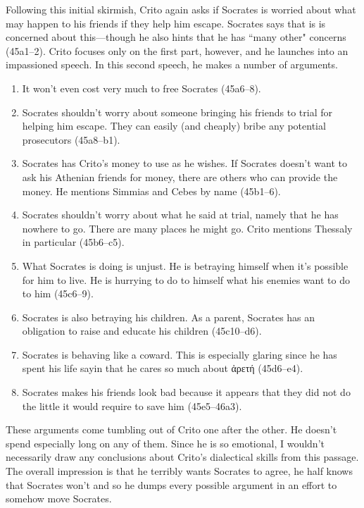 \documentclass[11pt]{article}
\begin{document}
Following this initial skirmish, Crito again asks if Socrates is worried about what may happen to his friends if they help him escape.  Socrates says that is is concerned about this---though he also hints that he has ``many other" concerns (45a1--2).  Crito focuses only on the first part, however, and he launches into an impassioned speech.  In this second speech, he makes a number of arguments.

\begin{enumerate}
    \item It won't even cost very much to free Socrates (45a6--8).
    \item Socrates shouldn't worry about someone bringing his friends to trial for helping him escape.  They can easily (and cheaply) bribe any potential prosecutors (45a8--b1).
    \item Socrates has Crito's money to use as he wishes.  If Socrates doesn't want to ask his Athenian friends for money, there are others who can provide the money.  He mentions Simmias and Cebes by name (45b1--6).
    \item Socrates shouldn't worry about what he said at trial, namely that he has nowhere to go.  There are many places he might go.  Crito mentions Thessaly in particular (45b6--c5).
    \item What Socrates is doing is unjust.  He is betraying himself when it's possible for him to live.  He is hurrying to do to himself what his enemies want to do to him (45c6--9).
    \item Socrates is also betraying his children.  As a parent, Socrates has an obligation to raise and educate his children (45c10--d6).
    \item Socrates is behaving like a coward.  This is especially glaring since he has spent his life sayin that he cares so much about ἀρετή (45d6--e4).
    \item Socrates makes his friends look bad because it appears that they did not do the little it would require to save him (45e5--46a3).
\end{enumerate}

These arguments come tumbling out of Crito one after the other.  He doesn't spend especially long on any of them.  Since he is so emotional, I wouldn't necessarily draw any conclusions about Crito's dialectical skills from this passage.  The overall impression is that he terribly wants Socrates to agree, he half knows that Socrates won't and so he dumps every possible argument in an effort to somehow move Socrates.
\end{document}
